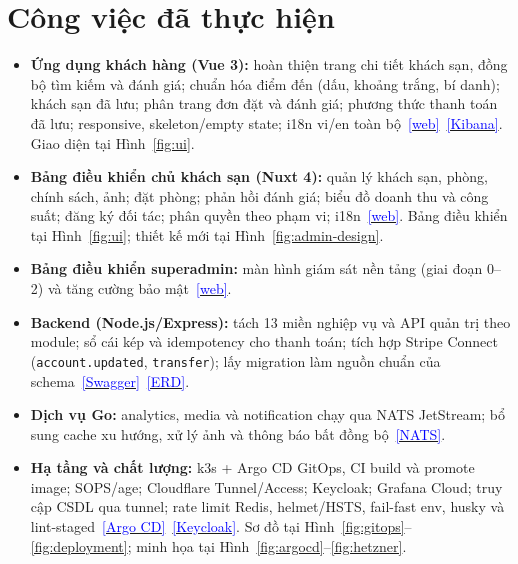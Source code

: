 \documentclass[12pt,a4paper]{article}
\newcommand{\gh}{https://github.com/bk-leducphuong/TravelNest-Hotel_Booking_System/blob/master}
\newcommand{\link}[2]{\href{#1}{\textcolor{blue}{\footnotesize[#2]}}}
\begin{document}
\section{Công việc đã thực hiện}

\begin{itemize}
  \item \textbf{Ứng dụng khách hàng (Vue 3):} hoàn thiện trang chi tiết khách sạn, đồng bộ tìm kiếm và đánh giá; chuẩn hóa điểm đến (dấu, khoảng trắng, bí danh); khách sạn đã lưu; phân trang đơn đặt và đánh giá; phương thức thanh toán đã lưu; responsive, skeleton/empty state; i18n vi/en toàn bộ~\link{https://deployserver.work}{web}~\link{\gh/docs/reports/images/ui_kibana_hotels.png}{Kibana}. Giao diện tại Hình~\ref{fig:ui}.
  \item \textbf{Bảng điều khiển chủ khách sạn (Nuxt 4):} quản lý khách sạn, phòng, chính sách, ảnh; đặt phòng; phản hồi đánh giá; biểu đồ doanh thu và công suất; đăng ký đối tác; phân quyền theo phạm vi; i18n~\link{https://admin.deployserver.work}{web}. Bảng điều khiển tại Hình~\ref{fig:ui}; thiết kế mới tại Hình~\ref{fig:admin-design}.
  \item \textbf{Bảng điều khiển superadmin:} màn hình giám sát nền tảng (giai đoạn 0--2) và tăng cường bảo mật~\link{https://superadmin.deployserver.work}{web}.
  \item \textbf{Backend (Node.js/Express):} tách 13 miền nghiệp vụ và API quản trị theo module; sổ cái kép và idempotency cho thanh toán; tích hợp Stripe Connect (\texttt{account.updated}, \texttt{transfer}); lấy migration làm nguồn chuẩn của schema~\link{https://api.deployserver.work/api-docs}{Swagger}~\link{\gh/docs/reports/images/fig_4_9_erd.png}{ERD}.
  \item \textbf{Dịch vụ Go:} analytics, media và notification chạy qua NATS JetStream; bổ sung cache xu hướng, xử lý ảnh và thông báo bất đồng bộ~\link{\gh/docs/reports/images/fig_5_2_nats.png}{NATS}.
  \item \textbf{Hạ tầng và chất lượng:} k3s + Argo CD GitOps, CI build và promote image; SOPS/age; Cloudflare Tunnel/Access; Keycloak; Grafana Cloud; truy cập CSDL qua tunnel; rate limit Redis, helmet/HSTS, fail-fast env, husky và lint-staged~\link{https://argocd.deployserver.work}{Argo CD}~\link{https://keycloak.deployserver.work}{Keycloak}. Sơ đồ tại Hình~\ref{fig:gitops}--\ref{fig:deployment}; minh họa tại Hình~\ref{fig:argocd}--\ref{fig:hetzner}.
\end{itemize}
\end{document}

